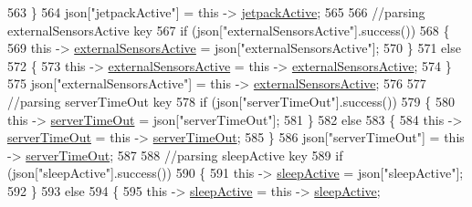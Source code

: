 \begin{DoxyCode}
563             \}
564             json[\textcolor{stringliteral}{"jetpackActive"}] = \textcolor{keyword}{this} -> \hyperlink{classCoolBoard_a9be03a913d26e558328935ca3b59a75e}{jetpackActive};
565 
566             \textcolor{comment}{//parsing externalSensorsActive key}
567             \textcolor{keywordflow}{if} (json[\textcolor{stringliteral}{"externalSensorsActive"}].success())
568             \{
569                 \textcolor{keyword}{this} -> \hyperlink{classCoolBoard_a638b00b76aeb819ecfd4c10b8cdd7bb7}{externalSensorsActive} = json[\textcolor{stringliteral}{"externalSensorsActive"}];
570             \}
571             \textcolor{keywordflow}{else}
572             \{
573                 \textcolor{keyword}{this} -> \hyperlink{classCoolBoard_a638b00b76aeb819ecfd4c10b8cdd7bb7}{externalSensorsActive} = \textcolor{keyword}{this} -> 
      \hyperlink{classCoolBoard_a638b00b76aeb819ecfd4c10b8cdd7bb7}{externalSensorsActive};
574             \}
575             json[\textcolor{stringliteral}{"externalSensorsActive"}] = \textcolor{keyword}{this} -> \hyperlink{classCoolBoard_a638b00b76aeb819ecfd4c10b8cdd7bb7}{externalSensorsActive};
576 
577             \textcolor{comment}{//parsing serverTimeOut key}
578             \textcolor{keywordflow}{if} (json[\textcolor{stringliteral}{"serverTimeOut"}].success())
579             \{
580                 \textcolor{keyword}{this} -> \hyperlink{classCoolBoard_a7a8d8d3d316220cdd049cd63c1aa8fe6}{serverTimeOut} = json[\textcolor{stringliteral}{"serverTimeOut"}];
581             \}
582             \textcolor{keywordflow}{else}
583             \{
584                 \textcolor{keyword}{this} -> \hyperlink{classCoolBoard_a7a8d8d3d316220cdd049cd63c1aa8fe6}{serverTimeOut} = \textcolor{keyword}{this} -> \hyperlink{classCoolBoard_a7a8d8d3d316220cdd049cd63c1aa8fe6}{serverTimeOut};
585             \}
586             json[\textcolor{stringliteral}{"serverTimeOut"}] = \textcolor{keyword}{this} -> \hyperlink{classCoolBoard_a7a8d8d3d316220cdd049cd63c1aa8fe6}{serverTimeOut};
587             
588             \textcolor{comment}{//parsing sleepActive key}
589             \textcolor{keywordflow}{if} (json[\textcolor{stringliteral}{"sleepActive"}].success())
590             \{
591                 \textcolor{keyword}{this} -> \hyperlink{classCoolBoard_a0a51b2287139f66c738101fb53139230}{sleepActive} = json[\textcolor{stringliteral}{"sleepActive"}];
592             \}
593             \textcolor{keywordflow}{else}
594             \{
595                 \textcolor{keyword}{this} -> \hyperlink{classCoolBoard_a0a51b2287139f66c738101fb53139230}{sleepActive} = \textcolor{keyword}{this} -> \hyperlink{classCoolBoard_a0a51b2287139f66c738101fb53139230}{sleepActive};

\end{DoxyCode}
